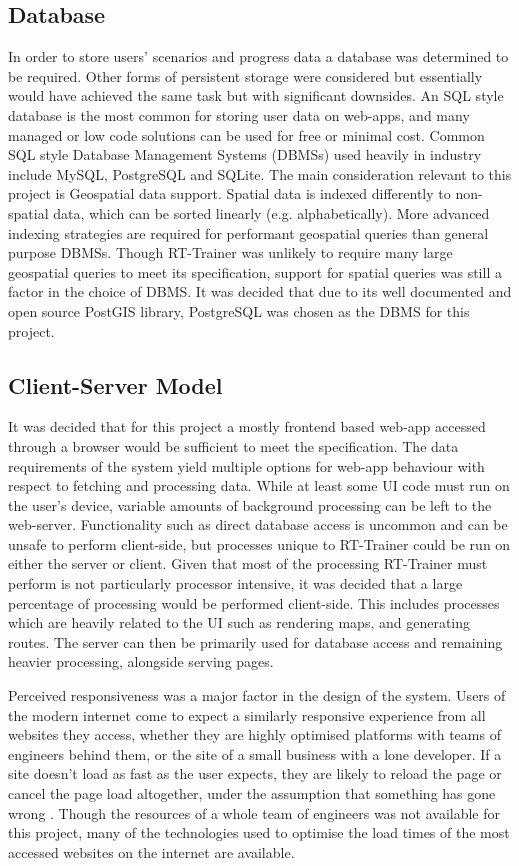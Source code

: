 \subsection{Database}
In order to store users' scenarios and progress data a database was determined to be required. Other forms of persistent storage were considered but essentially would have achieved the same task but with significant downsides. An SQL style database is the most common for storing user data on web-apps, and many managed or low code solutions can be used for free or minimal cost. Common SQL style Database Management Systems (DBMSs) used heavily in industry include MySQL, PostgreSQL and SQLite. The main consideration relevant to this project is Geospatial data support. Spatial data is indexed differently to non-spatial data, which can be sorted linearly (e.g. alphabetically). More advanced indexing strategies are required for performant geospatial queries than general purpose DBMSs. Though RT-Trainer was unlikely to require many large geospatial queries to meet its specification, support for spatial queries was still a factor in the choice of DBMS. It was decided that due to its well documented and open source PostGIS library, PostgreSQL was chosen as the DBMS for this project.

\subsection{Client-Server Model}
It was decided that for this project a mostly frontend based web-app accessed through a browser would be sufficient to meet the specification. The data requirements of the system yield multiple options for web-app behaviour with respect to fetching and processing data. While at least some UI code must run on the user's device, variable amounts of background processing can be left to the web-server. Functionality such as direct database access is uncommon and can be unsafe to perform client-side, but processes unique to RT-Trainer could be run on either the server or client. Given that most of the processing RT-Trainer must perform is not particularly processor intensive, it was decided that a large percentage of processing would be performed client-side. This includes processes which are heavily related to the UI such as rendering maps, and generating routes. The server can then be primarily used for database access and remaining heavier processing, alongside serving pages.

Perceived responsiveness was a major factor in the design of the system. Users of the modern internet come to expect a similarly responsive experience from all websites they access, whether they are highly optimised platforms with teams of engineers behind them, or the site of a small business with a lone developer. If a site doesn't load as fast as the user expects, they are likely to reload the page or cancel the page load altogether, under the assumption that something has gone wrong \cite{}. Though the resources of a whole team of engineers was not available for this project, many of the technologies used to optimise the load times of the most accessed websites on the internet are available.

